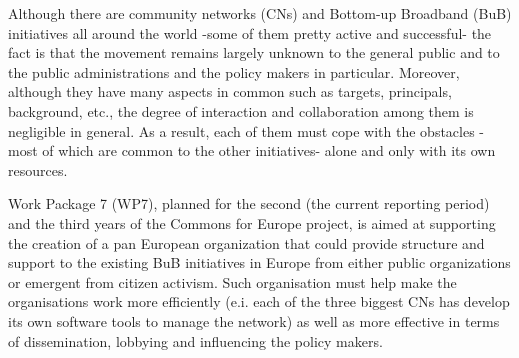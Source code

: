 Although there are community networks (CNs) and Bottom-up Broadband (BuB) initiatives all around the world -some of them pretty active and successful- the fact is that the movement remains largely unknown to the general public and to the public administrations and the policy makers in particular. Moreover, although they have many aspects in common such as targets, principals, background, etc., the degree of interaction and collaboration among them is negligible in general. As a result, each of them must cope with the obstacles -most of which are common to the other initiatives- alone and only with its own resources.

Work Package 7 (WP7), planned for the second (the current reporting period) and the third years of the Commons for Europe project, is aimed at supporting the creation of a pan European organization that could provide structure and support to the existing BuB initiatives in Europe from either public organizations or emergent from citizen activism. Such organisation must help make the organisations work more efficiently (e.i. each of the three biggest CNs has develop its own software tools to manage the network) as well as more effective in terms of dissemination, lobbying and influencing the policy makers.
